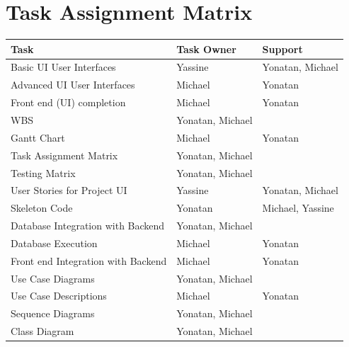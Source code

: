 \documentclass[11pt]{article}
\begin{document}
    \section{Task Assignment Matrix}\label{sec:task-assignment-matrix}
    \begin{table}[H]
        \centering
        \begin{tabular}{lll}
            \toprule
            \textbf{Task}                      & \textbf{Task Owner} & \textbf{Support} \\
            \midrule
            Basic UI User Interfaces           & Yassine             & Yonatan, Michael \\
            Advanced UI User Interfaces        & Michael             & Yonatan          \\
            Front end (UI) completion          & Michael             & Yonatan          \\
            WBS                                & Yonatan, Michael    &                  \\
            Gantt Chart                        & Michael             & Yonatan          \\
            Task Assignment Matrix             & Yonatan, Michael    &                  \\
            Testing Matrix                     & Yonatan, Michael    &                  \\
            User Stories for Project UI        & Yassine             & Yonatan, Michael \\
            Skeleton Code                      & Yonatan             & Michael, Yassine \\
            Database Integration with Backend  & Yonatan, Michael    &                  \\
            Database Execution                 & Michael             & Yonatan          \\
            Front end Integration with Backend & Michael             & Yonatan          \\
            Use Case Diagrams                  & Yonatan, Michael    &                  \\
            Use Case Descriptions              & Michael             & Yonatan          \\
            Sequence Diagrams                  & Yonatan, Michael    &                  \\
            Class Diagram                      & Yonatan, Michael    &                  \\

\end{tabular}
\end{table}
\end{document}
